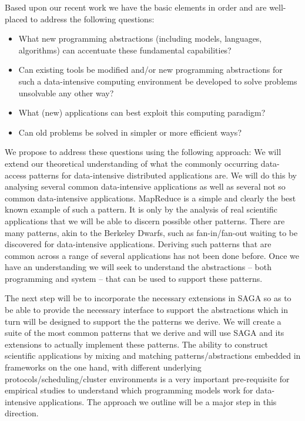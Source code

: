 \documentclass[10pt,letterpaper]{article}
\begin{document}
Based upon our recent work we have the basic elements in order
and are well-placed  to address the following questions:
\begin{itemize}
\item What new programming abstractions (including models, languages, algorithms) can accentuate these fundamental capabilities?
\item Can existing tools be modified and/or new programming abstractions for such a data-intensive computing environment be developed to solve problems unsolvable any other way? 
\item What (new) applications can best exploit this computing paradigm?
\item Can old problems be solved in simpler or more efficient ways? 
\end{itemize}

We propose to address these questions  using the following  approach: \newline
We will extend our theoretical understanding of what the commonly occurring 
data-access patterns for data-intensive distributed applications are. We will
do this by analysing several common data-intensive applications as well as
several not so common data-intensive applications.  
MapReduce is a simple and clearly the best known example of such 
a pattern. It is only by the analysis of real scientific applications that we will be able
to discern possible other patterns. There are many patterns, akin to the Berkeley Dwarfs, such as fan-in/fan-out waiting to be discovered  for data-intensive applications.
Deriving such patterns
that are common across a range of several applications has not been done before.
Once we have an understanding we will seek to understand the abstractions --
both programming and system -- that can be used to support these patterns.

The next step will be to incorporate the necessary extensions in SAGA
so as to be able to provide the necessary interface to support the abstractions 
which in turn will be designed to support the the patterns we derive. 
We will  create a suite of the most common patterns that we derive 
and will use SAGA and its extensions to
actually implement these patterns. 
The ability to construct scientific applications by mixing and matching
patterns/abstractions embedded in frameworks
on the one hand, with different underlying protocols/scheduling/cluster environments
is a very important pre-requisite for empirical studies to understand which 
programming models work for data-intensive applications. The approach we
outline will be a major step in this direction.
\end{document}
